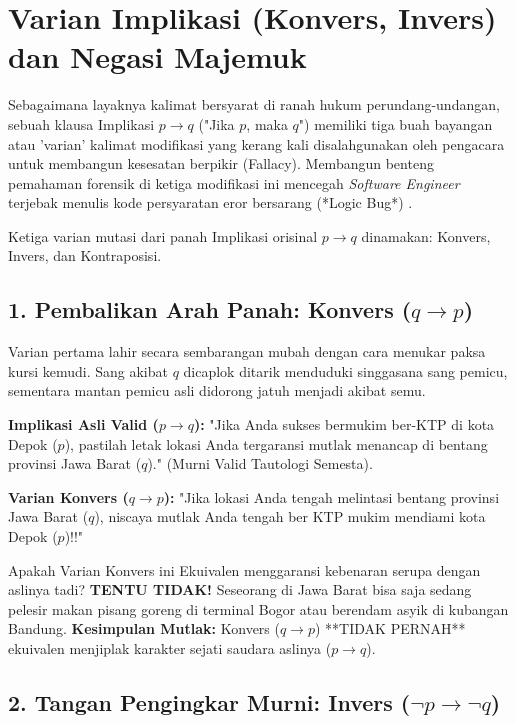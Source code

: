 \section{Varian Implikasi (Konvers, Invers) dan Negasi Majemuk}

Sebagaimana layaknya kalimat bersyarat di ranah hukum perundang-undangan, sebuah klausa Implikasi $p \rightarrow q$ ("Jika $p$, maka $q$") memiliki tiga buah bayangan atau 'varian' kalimat modifikasi yang kerang kali disalahgunakan oleh pengacara untuk membangun kesesatan berpikir (Fallacy). Membangun benteng pemahaman forensik di ketiga modifikasi ini mencegah \textit{Software Engineer} terjebak menulis kode persyaratan eror bersarang (*Logic Bug*) \cite{rosen2019}.

Ketiga varian mutasi dari panah Implikasi orisinal $p \rightarrow q$ dinamakan: Konvers, Invers, dan Kontraposisi.

\subsection{1. Pembalikan Arah Panah: Konvers ($q \rightarrow p$)}

Varian pertama lahir secara sembarangan mubah dengan cara menukar paksa kursi kemudi. Sang akibat $q$ dicaplok ditarik menduduki singgasana sang pemicu, sementara mantan pemicu asli didorong jatuh menjadi akibat semu.

\begin{contoh}
\textbf{Implikasi Asli Valid ($p \rightarrow q$):} "Jika Anda sukses bermukim ber-KTP di kota Depok ($p$), pastilah letak lokasi Anda tergaransi mutlak menancap di bentang provinsi Jawa Barat ($q$)." (Murni Valid Tautologi Semesta).

\textbf{Varian Konvers ($q \rightarrow p$):} "Jika lokasi Anda tengah melintasi bentang provinsi Jawa Barat ($q$), niscaya mutlak Anda tengah ber KTP mukim mendiami kota Depok ($p$)!!"

Apakah Varian Konvers ini Ekuivalen menggaransi kebenaran serupa dengan aslinya tadi? \textbf{TENTU TIDAK!} Seseorang di Jawa Barat bisa saja sedang pelesir makan pisang goreng di terminal Bogor atau berendam asyik di kubangan Bandung. 
\textbf{Kesimpulan Mutlak:} Konvers ($q \rightarrow p$) **TIDAK PERNAH** ekuivalen menjiplak karakter sejati saudara aslinya ($p \rightarrow q$). \cite{wiki_first_order_logic}
\end{contoh}

\subsection{2. Tangan Pengingkar Murni: Invers ($\neg p \rightarrow \neg q$)}

